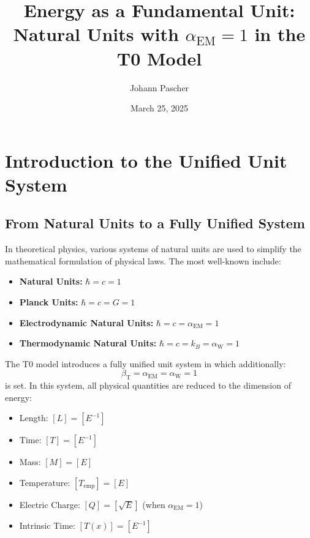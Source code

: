\documentclass[12pt,a4paper]{article}
\newcommand{\Tfield}{T(x)}
\newcommand{\betaT}{\beta_{\text{T}}}
\newcommand{\alphaEM}{\alpha_{\text{EM}}}
\newcommand{\alphaW}{\alpha_{\text{W}}}
\begin{document}
	
	\title{Energy as a Fundamental Unit: \\ Natural Units with \(\alphaEM = 1\) in the T0 Model}
	\author{Johann Pascher}
	\date{March 25, 2025}
	
	\maketitle
	\tableofcontents
	\newpage
	
	\section{Introduction to the Unified Unit System}
	
	\subsection{From Natural Units to a Fully Unified System}
	
	In theoretical physics, various systems of natural units are used to simplify the mathematical formulation of physical laws. The most well-known include:
	
	\begin{itemize}
		\item \textbf{Natural Units:} \(\hbar = c = 1\)
		\item \textbf{Planck Units:} \(\hbar = c = G = 1\)
		\item \textbf{Electrodynamic Natural Units:} \(\hbar = c = \alphaEM = 1\)
		\item \textbf{Thermodynamic Natural Units:} \(\hbar = c = k_B = \alphaW = 1\)
	\end{itemize}
	
	The T0 model introduces a fully unified unit system in which additionally:
	\begin{equation}
		\betaT = \alphaEM = \alphaW = 1
	\end{equation}
	is set. In this system, all physical quantities are reduced to the dimension of energy:
	
	\begin{tcolorbox}[colback=blue!5!white,colframe=blue!75!black,title=Dimensions in the Unified Unit System]
		\begin{itemize}
			\item Length: \([L] = [E^{-1}]\)
			\item Time: \([T] = [E^{-1}]\)
			\item Mass: \([M] = [E]\)
			\item Temperature: \([T_{\text{emp}}] = [E]\)
			\item Electric Charge: \([Q] = [\sqrt{E}]\) (when \(\alphaEM = 1\))
			\item Intrinsic Time: \([\Tfield] = [E^{-1}]\)
		\end{itemize}
	\end{tcolorbox}
	
\end{document}
